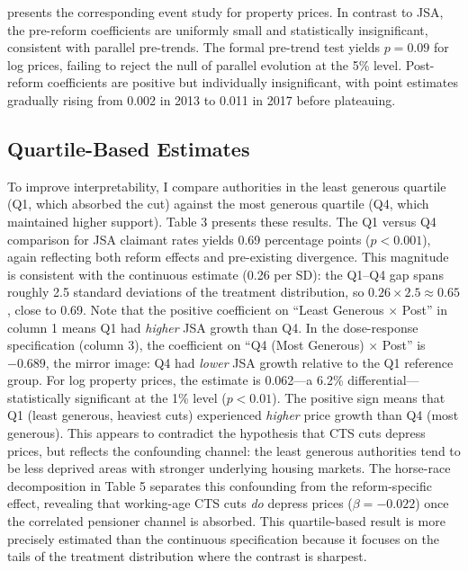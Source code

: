 \documentclass[12pt]{article}
\begin{document}
 presents the corresponding event study for property prices. In contrast to JSA, the pre-reform coefficients are uniformly small and statistically insignificant, consistent with parallel pre-trends. The formal pre-trend test yields $p = 0.09$ for log prices, failing to reject the null of parallel evolution at the 5\% level. Post-reform coefficients are positive but individually insignificant, with point estimates gradually rising from 0.002 in 2013 to 0.011 in 2017 before plateauing.

\subsection{Quartile-Based Estimates}



To improve interpretability, I compare authorities in the least generous quartile (Q1, which absorbed the cut) against the most generous quartile (Q4, which maintained higher support). Table 3 presents these results. The Q1 versus Q4 comparison for JSA claimant rates yields 0.69 percentage points ($p < 0.001$), again reflecting both reform effects and pre-existing divergence. This magnitude is consistent with the continuous estimate (0.26 per SD): the Q1--Q4 gap spans roughly 2.5 standard deviations of the treatment distribution, so $0.26 \times 2.5 \approx 0.65$, close to 0.69. Note that the positive coefficient on ``Least Generous $\times$ Post'' in column 1 means Q1 had \textit{higher} JSA growth than Q4. In the dose-response specification (column 3), the coefficient on ``Q4 (Most Generous) $\times$ Post'' is $-0.689$, the mirror image: Q4 had \textit{lower} JSA growth relative to the Q1 reference group. For log property prices, the estimate is 0.062---a 6.2\% differential---statistically significant at the 1\% level ($p < 0.01$). The positive sign means that Q1 (least generous, heaviest cuts) experienced \textit{higher} price growth than Q4 (most generous). This appears to contradict the hypothesis that CTS cuts depress prices, but reflects the confounding channel: the least generous authorities tend to be less deprived areas with stronger underlying housing markets. The horse-race decomposition in Table 5 separates this confounding from the reform-specific effect, revealing that working-age CTS cuts \textit{do} depress prices ($\beta = -0.022$) once the correlated pensioner channel is absorbed. This quartile-based result is more precisely estimated than the continuous specification because it focuses on the tails of the treatment distribution where the contrast is sharpest.
\end{document}
